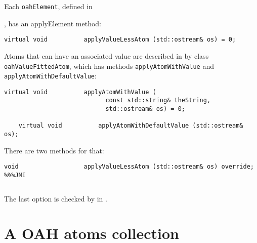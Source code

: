 Each {\tt oahElement}, defined in {, has an applyElement {\tt } method:
\begin{lstlisting}[language=CPlusPlus]
    virtual void          applyValueLessAtom (std::ostream& os) = 0;
\end{lstlisting}

Atoms that can have an associated value are described in  by class   {\tt oahValueFittedAtom}, which has methods {\tt applyAtomWithValue} and {\tt applyAtomWithDefaultValue}:
\begin{lstlisting}[language=CPlusPlus]
    virtual void          applyAtomWithValue (
                            const std::string& theString,
                            std::ostream& os) = 0;

    virtual void          applyAtomWithDefaultValue (std::ostream& os);
\end{lstlisting}

There are two methods for that:%
\begin{lstlisting}[language=CPlusPlus]
    void                  applyValueLessAtom (std::ostream& os) override; %%%JMI
\end{lstlisting}

\begin{lstlisting}[language=CPlusPlus]

\end{lstlisting}

The last option is checked by  in . %


\section{A OAH atoms collection}

}
